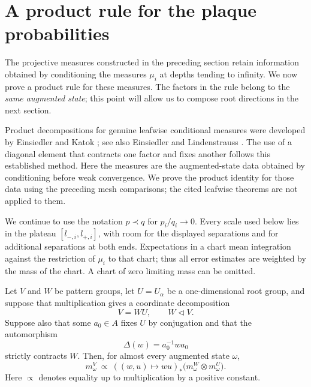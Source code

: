 \section{A product rule for the plaque probabilities}\label{sec:product}

The projective measures constructed in the preceding section retain
information obtained by conditioning the measures \(\mu_i\) at depths
tending to infinity.  We now prove a product rule for these measures.
The factors in the rule belong to the \emph{same augmented state}; this
point will allow us to compose root directions in the next section.

Product decompositions for genuine leafwise conditional measures were
developed by Einsiedler and Katok
\citep[Proposition~8.3]{EK2003}
\citep[Theorems~8.4--8.5]{EK2005}; see also
Einsiedler and Lindenstrauss
\citep[Corollary~8.8 and Theorem~9.8]{EL2010}.
The use of a diagonal element that contracts one factor and fixes
another follows this established method.  Here the measures are the
augmented-state data obtained by conditioning before weak convergence.
We prove the product identity for those data using the preceding
mesh comparisons; the cited leafwise theorems are not applied to them.

We continue to use the notation \(p\prec q\) for \(p_i/q_i\to0\).
Every scale used below lies in the plateau
\([l_{-,i},l_{+,i}]\), with room for the displayed separations and for
additional separations at both ends.  Expectations in a chart mean
integration against the restriction of \(\mu_i\) to that chart; thus
all error estimates are weighted by the mass of the chart.  A chart of
zero limiting mass can be omitted.

\begin{theorem}\label{thm:product}
Let \(V\) and \(W\) be pattern groups, let \(U=U_\alpha\) be a
one-dimensional root group, and suppose that multiplication gives a
coordinate decomposition
\[
                 V=WU,\qquad W\mathrel{\triangleleft}V.
\]
Suppose also that some \(a_0\in A\) fixes \(U\) by conjugation and that
the automorphism
\[
                 \Delta(w)=a_0^{-1}wa_0
\]
strictly contracts \(W\).  Then, for almost every augmented state
\(\omega\),
\begin{equation}\label{eq:product-rule}
 m^V_\omega
   \ \propto\
   ( (w,u)\longmapsto wu)_*
          \bigl(m^W_\omega\otimes m^U_\omega\bigr).
\end{equation}
Here \(\propto\) denotes equality up to multiplication by a positive
constant.
\end{theorem}

